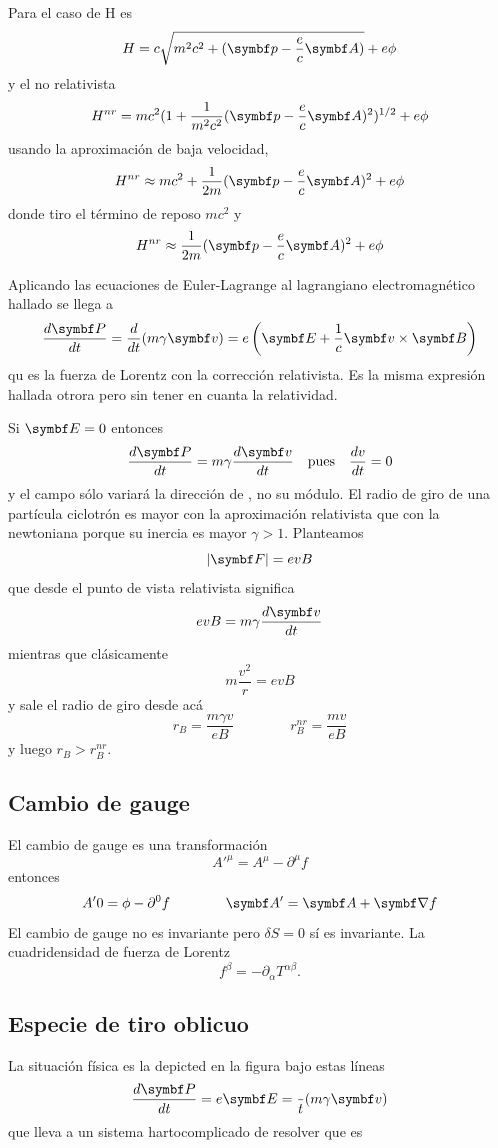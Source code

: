 \documentclass[10pt,oneside]{CBFT_book}
\begin{document}
Para el caso de H es 
\[
	H = c \sqrt{ m^2 c^2 + ( \vb{p} - \frac{e}{c}\vb{A} )} + e \phi
\]
y el no relativista
\[
	H^{nr} = m c^2 ( 1 + \frac{1}{m^2 c^2}(\vb{p} - \frac{e}{c}\vb{A} )^2 )^{1/2} + e \phi
\]
usando la aproximación de baja velocidad,
\[
	H^{nr} \approx m c^2 + \frac{1}{2m} ( \vb{p} - \frac{e}{c}\vb{A} )^2 + e \phi
\]
donde tiro el término de reposo $mc^2$ y
\[
	H^{nr} \approx \frac{1}{2m} ( \vb{p} - \frac{e}{c}\vb{A} )^2 + e \phi
\]

Aplicando las ecuaciones de Euler-Lagrange al lagrangiano electromagnético hallado se llega a
\[
	\dtot{\vb{P}}{t} = \dtot{}{t}(m\gamma\vb{v}) = e \left(  \vb{E} + \frac{1}{c}\pv{v}{B} \right)
\]
qu es la fuerza de Lorentz con la corrección relativista. Es la misma expresión hallada otrora pero
sin tener en cuanta la relatividad.

Si $\vb{E}=0$ entonces 
\[
	\dtot{\vb{P}}{t} = m \gamma \dtot{\vb{v}}{t} \quad \text{pues} \quad \dtot{v}{t} = 0 
\]
y el campo  sólo variará la dirección de , no su módulo.
El radio de giro de una partícula ciclotrón es mayor con la aproximación relativista que con la newtoniana
porque su inercia es mayor $\gamma > 1$. Planteamos
\[
	|\vb{F}| = e v B
\]
que desde el punto de vista relativista significa
\[
	e v B =  m \gamma \dtot{\vb{v}}{t}
\]
mientras que clásicamente 
\[
	m \frac{v^2}{r} = e v B 
\]
y sale el radio de giro desde acá
\[
	r_B = \frac{m\gamma v}{eB} \qquad\qquad r_B^{nr} = \frac{m v}{eB}
\]
y luego $ r_B > r_B^{nr}$.

\subsection{Cambio de gauge}

El cambio de gauge es una transformación 
\[
	A'^\mu = A^\mu - \partial^\mu f
\]
entonces 
\[
	A'0 = \phi - \partial^0 f \qquad \qquad \vb{A}' = \vb{A} + \Nabla f
\]
El cambio de gauge no es invariante pero $\delta S = 0$ sí es invariante.
La cuadridensidad de fuerza de Lorentz 
\[
	f^\beta = - \partial_\alpha T^{\alpha\beta}.
\]

\subsection{Especie de tiro oblicuo}

La situación física es la depicted en la figura bajo estas líneas
\[
	\dtot{\vb{P}}{t} = e\vb{E} = \frac{}{t}( m \gamma \vb{v} )
\]
que lleva a un sistema hartocomplicado de resolver que es 
\end{document}
